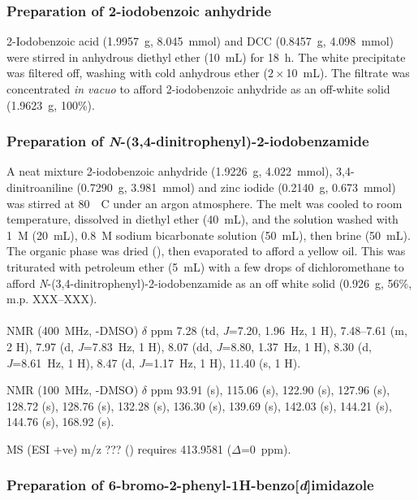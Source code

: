 \begin{refsection}
\normalsize

\subsubsection{Preparation of 2-iodobenzoic anhydride }
2-Iodobenzoic acid (1.9957~g, 8.045~mmol) and DCC (0.8457~g, 4.098~mmol) were stirred in anhydrous diethyl ether (10~mL) for 18~h. The white precipitate was filtered off, washing with cold anhydrous ether ($2\times$10~mL). The filtrate was concentrated \emph{in vacuo} to afford 2-iodobenzoic anhydride  as an off-white solid (1.9623~g, 100\%).


\subsubsection{Preparation of \emph{N}-(3,4-dinitrophenyl)-2-iodobenzamide }
A neat mixture 2-iodobenzoic anhydride  (1.9226~g, 4.022~mmol), 3,4-dinitroaniline (0.7290~g, 3.981~mmol) and zinc iodide (0.2140~g, 0.673~mmol) was stirred at 80~\degree~C under an argon atmosphere.
The melt was cooled to room temperature, dissolved in diethyl ether (40~mL), and the solution washed with 1~\textsc{M}  (20~mL), 0.8~\textsc{M} sodium bicarbonate solution (50~mL), then brine (50~mL).
The organic phase was dried (), then evaporated to afford a yellow oil.
This was triturated with petroleum ether (5~mL) with a few drops of dichloromethane to afford \emph{N}-(3,4-dinitrophenyl)-2-iodobenzamide  as an off white solid (0.926~g, 56\%, m.p. XXX--XXX).\autocite{Shivani2007}

\footnotesize\paragraph{}

 NMR (400~MHz, -DMSO) $\delta$ ppm
7.28 (td, \emph{J}=7.20, 1.96~Hz, 1 H),
7.48--7.61 (m, 2 H),
7.97 (d, \emph{J}=7.83~Hz, 1 H),
8.07 (dd, \emph{J}=8.80, 1.37~Hz, 1 H),
8.30 (d, \emph{J}=8.61~Hz, 1 H),
8.47 (d, \emph{J}=1.17~Hz, 1 H),
11.40 (s, 1 H).

 NMR (100~MHz, -DMSO) $\delta$ ppm
93.91 (s),
115.06 (s),
122.90 (s),
127.96 (s),
128.72 (s),
128.76 (s),
132.28 (s),
136.30 (s),
139.69 (s),
142.03 (s),
144.21 (s),
144.76 (s),
168.92 (s).

MS (ESI +ve) m/z ??? ()  requires 413.9581 ($\Delta$=0~ppm).

\normalsize

\subsubsection{Preparation of 6-bromo-2-phenyl-1\textbf{H}-benzo[\emph{d}]imidazole}

\printbibliography[heading=subbibliography]
\end{refsection}
